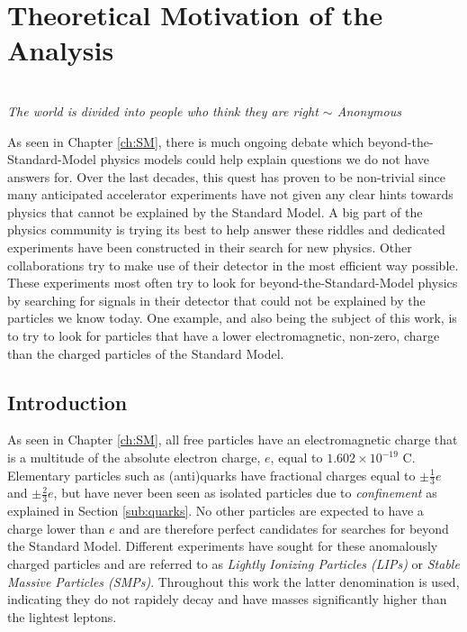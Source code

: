 \chapter{Theoretical Motivation of the Analysis}
\label{ch:theoreticalmotivation}
\begin{flushright}
\textit{\\The world is divided into people who think they are right $\sim$ Anonymous\\}
\end{flushright}

\noindent As seen in Chapter \ref{ch:SM}, there is much ongoing debate which beyond-the-Standard-Model physics models could help explain questions we do not have answers for. Over the last decades, this quest has proven to be non-trivial since many anticipated accelerator experiments have not given any clear hints towards physics that cannot be explained by the Standard Model. A big part of the physics community is trying its best to help answer these riddles and dedicated experiments have been constructed in their search for new physics. Other collaborations try to make use of their detector in the most efficient way possible. These experiments most often try to look for beyond-the-Standard-Model physics by searching for signals in their detector that could not be explained by the particles we know today. One example, and also being the subject of this work, is to try to look for particles that have a lower electromagnetic, non-zero, charge than the charged particles of the Standard Model.

\section{Introduction}
As seen in Chapter \ref{ch:SM}, all free particles have an electromagnetic charge that is a multitude of the absolute electron charge, $e$, equal to $1.602 \times 10^{-19}$ C. Elementary particles such as (anti)quarks have fractional charges equal to $\pm\frac{1}{3}e$ and $\pm\frac{2}{3}e$, but have never been seen as isolated particles due to \textit{confinement} as explained in Section \ref{sub:quarks}. No other particles are expected to have a charge lower than $e$ and are therefore perfect candidates for searches for beyond the Standard Model. Different experiments have sought for these anomalously charged particles and are referred to as \textit{Lightly Ionizing Particles (LIPs)} or \textit{Stable Massive Particles (SMPs)}. Throughout this work the latter denomination is used, indicating they do not rapidely decay and have masses significantly higher than the lightest leptons.

